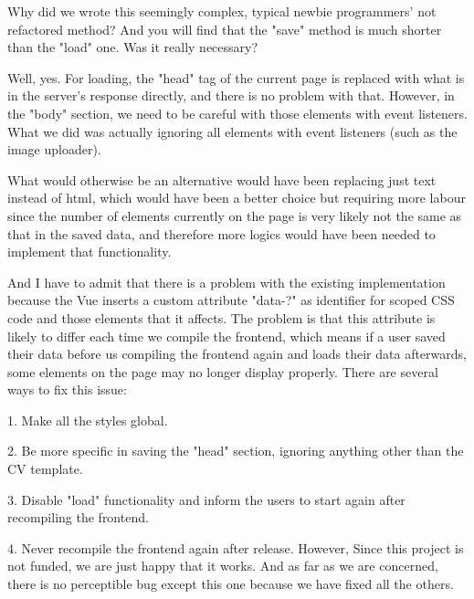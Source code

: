 \documentclass[11pt]{article}
\begin{document}
\begin{spacing}{1.0}
\begin{itemize}
	Why did we wrote this seemingly complex, typical newbie programmers' not refactored method? And you will find that the "save" method is much shorter than the "load" one. Was it really necessary?
	
	Well, yes. For loading, the "head" tag of the current page is replaced with what is in the server's response directly, and there is no problem with that. However, in the "body" section, we need to be careful with those elements with event listeners. What we did was actually ignoring all elements with event listeners (such as the image uploader).
	
	What would otherwise be an alternative would have been replacing just text instead of html, which would have been a better choice but requiring more labour since the number of elements currently on the page is very likely not the same as that in the saved data, and therefore more logics would have been needed to implement that functionality.
	
	And I have to admit that there is a problem with the existing implementation because the Vue inserts a custom attribute "data-?" as identifier for scoped CSS code and those elements that it affects. The problem is that this attribute is likely to differ each time we compile the frontend, which means if a user saved their data before us compiling the frontend again and loads their data afterwards, some elements on the page may no longer display properly.
	\newline\newline
	There are several ways to fix this issue:
	
	1. Make all the styles global.
	
	2. Be more specific in saving the "head" section, ignoring anything other than the CV template.
	
	3. Disable "load" functionality and inform the users to start again after recompiling the frontend.
	
	4. Never recompile the frontend again after release.
	\newline\newline
	However, Since this project is not funded, we are just happy that it works. And as far as we are concerned, there is no perceptible bug except this one because we have fixed all the others. 
	
	
	
	\end{itemize}
	
	
	
	
	

\end{spacing}
\end{document}
